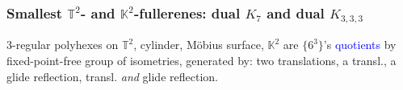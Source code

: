 \documentclass{beamer}
\begin{document}
\begin{frame}\frametitle{Smallest  $\mathbb{T}^2$- and $\mathbb{K}^2$-fullerenes: dual $K_7$ and dual 
$K_{3,3,3}$}
\vspace{-3mm}



\begin{center}
\centering
{}\par
\end{center}

$3$-regular  polyhexes 
on $\mathbb{T}^2$, cylinder,
M\"obius surface, $\mathbb{K}^2$
 are $\{6^3\}$'s \textcolor{blue}{quotients}  by 
fixed-point-free
 group of isometries, generated by:
 two translations, a transl., a glide reflection, transl. {\em and}
glide reflection.


\end{frame}
\end{document}
